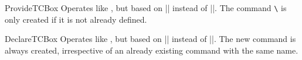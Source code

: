 \begin{docCommand}{ProvideTCBox}{}
  Operates like , but based on |\ProvideDocumentCommand| instead of |\NewDocumentCommand|.
  The command \texttt{\textbackslash} is only created if it is not already defined.
\end{docCommand}

\begin{docCommand}{DeclareTCBox}{}
  Operates like , but based on |\DeclareDocumentCommand| instead of |\NewDocumentCommand|.
  The new command is always created, irrespective of an already existing
  command with the same name.
\end{docCommand}


\clearpage


